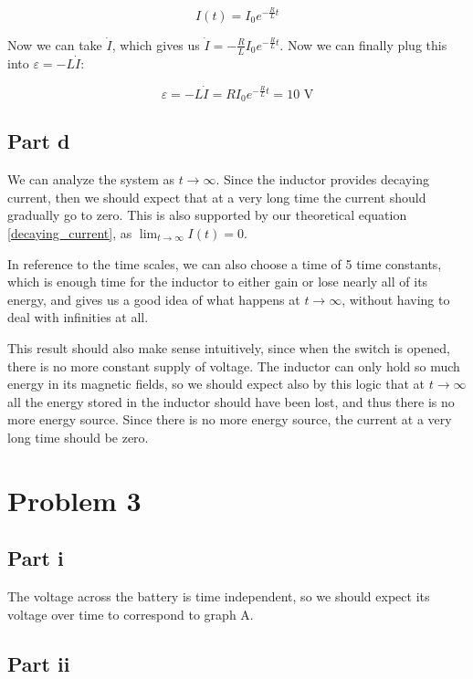 \documentclass{article}
\theoremstyle{definition}
\numberwithin{equation}{section}
\numberwithin{definition}{section}
\begin{document}
\begin{equation}
    \label{decaying_current}
    I(t) = I_0 e^{-\frac{R}{L}t}
\end{equation}

Now we can take $\dot I$, which gives us $\dot I = -\frac{R}{L}I_0 e^{-\frac{R}{L} t}$. Now we can finally plug this into $\varepsilon = -L\dot I$:

\[ \varepsilon = -L \dot I = RI_0 e^{-\frac{R}{L} t} = 10 \text { V}\]


\subsection*{Part d}

We can analyze the system as $t \to \infty$. Since the inductor provides decaying current, then we should expect that at a very long time the current should gradually go to zero. This is also supported by our theoretical equation \ref{decaying_current}, as $\lim_{t \to \infty} I(t) = 0$. 

In reference to the time scales, we can also choose a time of 5 time constants, which is enough time for the inductor to either gain or lose nearly all of its energy, and gives us a good idea of what happens at $t \to \infty$, without having to deal with infinities at all.

This result should also make sense intuitively, since when the switch is opened, there is no more constant supply of voltage. The inductor can only hold so much energy in its magnetic fields, so we should expect also by this logic that at $t \to \infty$ all the energy stored in the inductor should have been lost, and thus there is no more energy source. Since there is no more energy source, the current at a very long time should be zero.

\section{Problem 3}

\subsection*{Part i}

The voltage across the battery is time independent, so we should expect its voltage over time to correspond to graph $\boxed{\text{A}}$.

\subsection*{Part ii}
\end{document}
